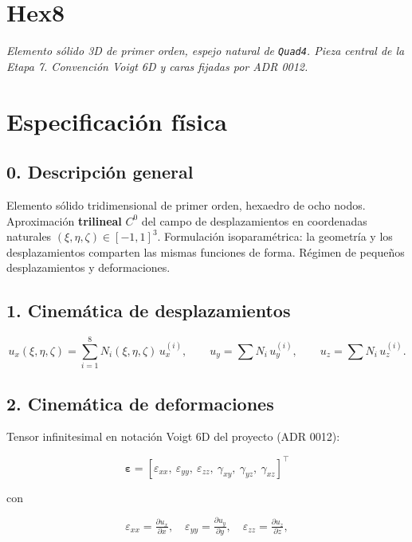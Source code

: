 \documentclass[11pt,letterpaper,oneside]{report}
\begin{document}
\newpage

\section{Hex8}



\textit{Elemento sólido 3D de primer orden, espejo natural de \texttt{Quad4}. Pieza central de la Etapa 7. Convención Voigt 6D y caras fijadas por ADR 0012.}



\section{Especificación física}

\subsection{0. Descripción general}

Elemento sólido tridimensional de primer orden, hexaedro de ocho nodos. Aproximación \textbf{trilineal} $C^0$ del campo de desplazamientos en coordenadas naturales $(\xi, \eta, \zeta) \in [-1, 1]^3$. Formulación isoparamétrica: la geometría y los desplazamientos comparten las mismas funciones de forma. Régimen de pequeños desplazamientos y deformaciones.

\subsection{1. Cinemática de desplazamientos}

\[
u_x(\xi, \eta, \zeta) = \sum_{i=1}^{8} N_i(\xi, \eta, \zeta)\, u_x^{(i)}, \qquad u_y = \sum N_i\, u_y^{(i)}, \qquad u_z = \sum N_i\, u_z^{(i)}.
\]

\subsection{2. Cinemática de deformaciones}

Tensor infinitesimal en notación Voigt 6D del proyecto (ADR 0012):

\[
\boldsymbol\varepsilon = [\varepsilon_{xx},\ \varepsilon_{yy},\ \varepsilon_{zz},\ \gamma_{xy},\ \gamma_{yz},\ \gamma_{xz}]^\top
\]

con

\[
\varepsilon_{xx} = \tfrac{\partial u_x}{\partial x},\quad \varepsilon_{yy} = \tfrac{\partial u_y}{\partial y},\quad \varepsilon_{zz} = \tfrac{\partial u_z}{\partial z},
\]
\end{document}
